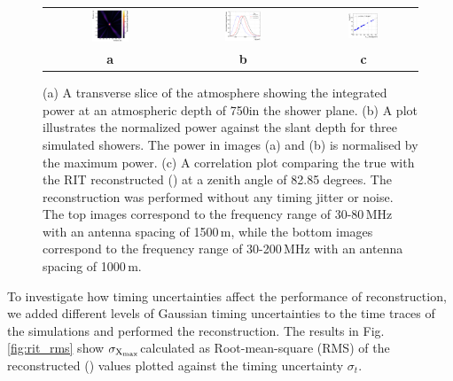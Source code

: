 \begin{figure}
\begin{tabular}{ccc}
\includegraphics[width=0.3\textwidth]{plt_axis_200.png} & \includegraphics[width=0.3\textwidth]{long_pow_grand.png} & \includegraphics[width=0.3\textwidth]{XvXrit_2.png} \\        
         \textbf{a} & \textbf{b} & \textbf{c}
    \end{tabular}
    \caption{(a) A transverse slice of the atmosphere showing the integrated power at an atmospheric depth of 750\gr in the shower plane. (b) A plot illustrates the normalized power against the slant depth \x for three simulated showers. The power in images (a) and (b) is normalised by the maximum power. (c) A correlation plot comparing the true \xmax with the RIT reconstructed \xmax (\xrit) at a zenith angle of 82.85 degrees. The reconstruction was performed without any timing jitter or noise. The top images correspond to the frequency range of 30-80\,MHz with an antenna spacing of 1500\,m, while the bottom images correspond to the frequency range of 30-200\,MHz with an antenna spacing of 1000\,m.}
    \label{fig:grid}
\end{figure}


To investigate how timing uncertainties affect the performance of \xmax reconstruction, we added different levels of Gaussian timing uncertainties to the time traces of the simulations and performed the reconstruction. The results in Fig. \ref{fig:rit_rms} show $\rm \sigma_{X_{max}}$calculated as Root-mean-square (RMS) of the reconstructed \xmax (\xrit) values plotted against the timing uncertainty $\sigma_t$.  


